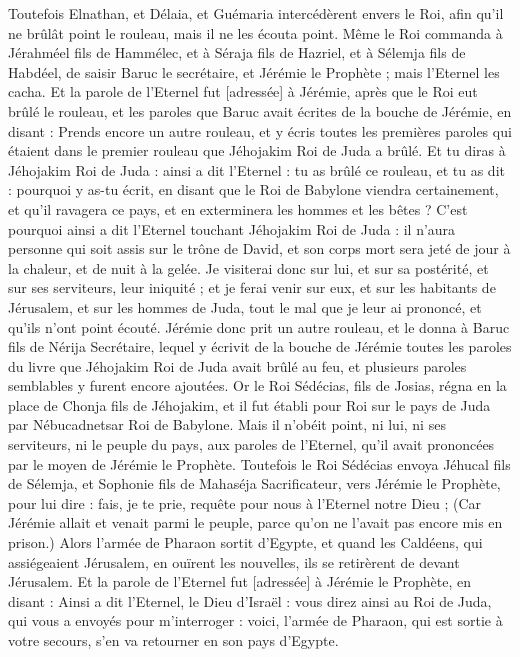 \begin{multicols}{2}
Toutefois Elnathan, et Délaia, et Guémaria intercédèrent envers le Roi, afin qu'il ne brûlât point le rouleau, mais il ne les écouta point.
Même le Roi commanda à Jérahméel fils de Hammélec, et à Séraja fils de Hazriel, et à Sélemja fils de Habdéel, de saisir Baruc le secrétaire, et Jérémie le Prophète ; mais l'Eternel les cacha.
Et la parole de l'Eternel fut [adressée] à Jérémie, après que le Roi eut brûlé le rouleau, et les paroles que Baruc avait écrites de la bouche de Jérémie, en disant :
Prends encore un autre rouleau, et y écris toutes les premières paroles qui étaient dans le premier rouleau que Jéhojakim Roi de Juda a brûlé.
Et tu diras à Jéhojakim Roi de Juda : ainsi a dit l'Eternel : tu as brûlé ce rouleau, et tu as dit : pourquoi y as-tu écrit, en disant que le Roi de Babylone viendra certainement, et qu'il ravagera ce pays, et en exterminera les hommes et les bêtes ?
C'est pourquoi ainsi a dit l'Eternel touchant Jéhojakim Roi de Juda : il n'aura personne qui soit assis sur le trône de David, et son corps mort sera jeté de jour à la chaleur, et de nuit à la gelée.
Je visiterai donc sur lui, et sur sa postérité, et sur ses serviteurs, leur iniquité ; et je ferai venir sur eux, et sur les habitants de Jérusalem, et sur les hommes de Juda, tout le mal que je leur ai prononcé, et qu'ils n'ont point écouté.
Jérémie donc prit un autre rouleau, et le donna à Baruc fils de Nérija Secrétaire, lequel y écrivit de la bouche de Jérémie toutes les paroles du livre que Jéhojakim Roi de Juda avait brûlé au feu, et plusieurs paroles semblables y furent encore ajoutées.
\VerseOne{}Or le Roi Sédécias, fils de Josias, régna en la place de Chonja fils de Jéhojakim, et il fut établi pour Roi sur le pays de Juda par Nébucadnetsar Roi de Babylone.
Mais il n'obéit point, ni lui, ni ses serviteurs, ni le peuple du pays, aux paroles de l'Eternel, qu'il avait prononcées par le moyen de Jérémie le Prophète.
Toutefois le Roi Sédécias envoya Jéhucal fils de Sélemja, et Sophonie fils de Mahaséja Sacrificateur, vers Jérémie le Prophète, pour lui dire : fais, je te prie, requête pour nous à l'Eternel notre Dieu ;
(Car Jérémie allait et venait parmi le peuple, parce qu'on ne l'avait pas encore mis en prison.)
Alors l'armée de Pharaon sortit d'Egypte, et quand les Caldéens, qui assiégeaient Jérusalem, en ouïrent les nouvelles, ils se retirèrent de devant Jérusalem.
Et la parole de l'Eternel fut [adressée] à Jérémie le Prophète, en disant :
Ainsi a dit l'Eternel, le Dieu d'Israël : vous direz ainsi au Roi de Juda, qui vous a envoyés pour m'interroger : voici, l'armée de Pharaon, qui est sortie à votre secours, s'en va retourner en son pays d'Egypte.

\end{multicols}
